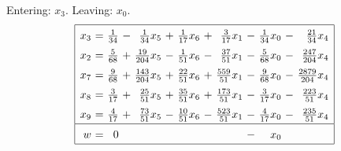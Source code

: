 \documentclass[11pt]{article}
\begin{document}
Entering: $x_{3}$. Leaving: $x_{0}$. 
\begin{equation*}
\renewcommand{\arraystretch}{1.5} %
\begin{array}{|rcrcrcrcrcrcr|}
\hline
x_{3} \mspace{-6mu}&\mspace{-6mu} = \mspace{-6mu}&\mspace{-6mu} \frac{1}{34} \mspace{-6mu}&\mspace{-6mu} - \mspace{-6mu}&\mspace{-6mu} \frac{1}{34} x_{5} \mspace{-6mu}&\mspace{-6mu} + \mspace{-6mu}&\mspace{-6mu} \frac{1}{17} x_{6} \mspace{-6mu}&\mspace{-6mu} + \mspace{-6mu}&\mspace{-6mu} \frac{3}{17} x_{1} \mspace{-6mu}&\mspace{-6mu} - \mspace{-6mu}&\mspace{-6mu} \frac{1}{34} x_{0} \mspace{-6mu}&\mspace{-6mu} - \mspace{-6mu}&\mspace{-6mu} \frac{21}{34} x_{4}\\
x_{2} \mspace{-6mu}&\mspace{-6mu} = \mspace{-6mu}&\mspace{-6mu} \frac{5}{68} \mspace{-6mu}&\mspace{-6mu} + \mspace{-6mu}&\mspace{-6mu} \frac{19}{204} x_{5} \mspace{-6mu}&\mspace{-6mu} - \mspace{-6mu}&\mspace{-6mu} \frac{1}{51} x_{6} \mspace{-6mu}&\mspace{-6mu} - \mspace{-6mu}&\mspace{-6mu} \frac{37}{51} x_{1} \mspace{-6mu}&\mspace{-6mu} - \mspace{-6mu}&\mspace{-6mu} \frac{5}{68} x_{0} \mspace{-6mu}&\mspace{-6mu} - \mspace{-6mu}&\mspace{-6mu} \frac{247}{204} x_{4}\\
x_{7} \mspace{-6mu}&\mspace{-6mu} = \mspace{-6mu}&\mspace{-6mu} \frac{9}{68} \mspace{-6mu}&\mspace{-6mu} + \mspace{-6mu}&\mspace{-6mu} \frac{143}{204} x_{5} \mspace{-6mu}&\mspace{-6mu} + \mspace{-6mu}&\mspace{-6mu} \frac{22}{51} x_{6} \mspace{-6mu}&\mspace{-6mu} + \mspace{-6mu}&\mspace{-6mu} \frac{559}{51} x_{1} \mspace{-6mu}&\mspace{-6mu} - \mspace{-6mu}&\mspace{-6mu} \frac{9}{68} x_{0} \mspace{-6mu}&\mspace{-6mu} - \mspace{-6mu}&\mspace{-6mu} \frac{2879}{204} x_{4}\\
x_{8} \mspace{-6mu}&\mspace{-6mu} = \mspace{-6mu}&\mspace{-6mu} \frac{3}{17} \mspace{-6mu}&\mspace{-6mu} + \mspace{-6mu}&\mspace{-6mu} \frac{25}{51} x_{5} \mspace{-6mu}&\mspace{-6mu} + \mspace{-6mu}&\mspace{-6mu} \frac{35}{51} x_{6} \mspace{-6mu}&\mspace{-6mu} + \mspace{-6mu}&\mspace{-6mu} \frac{173}{51} x_{1} \mspace{-6mu}&\mspace{-6mu} - \mspace{-6mu}&\mspace{-6mu} \frac{3}{17} x_{0} \mspace{-6mu}&\mspace{-6mu} - \mspace{-6mu}&\mspace{-6mu} \frac{223}{51} x_{4}\\
x_{9} \mspace{-6mu}&\mspace{-6mu} = \mspace{-6mu}&\mspace{-6mu} \frac{4}{17} \mspace{-6mu}&\mspace{-6mu} + \mspace{-6mu}&\mspace{-6mu} \frac{73}{51} x_{5} \mspace{-6mu}&\mspace{-6mu} - \mspace{-6mu}&\mspace{-6mu} \frac{10}{51} x_{6} \mspace{-6mu}&\mspace{-6mu} - \mspace{-6mu}&\mspace{-6mu} \frac{523}{51} x_{1} \mspace{-6mu}&\mspace{-6mu} - \mspace{-6mu}&\mspace{-6mu} \frac{4}{17} x_{0} \mspace{-6mu}&\mspace{-6mu} - \mspace{-6mu}&\mspace{-6mu} \frac{235}{51} x_{4}\\
\hline
w \mspace{-6mu}&\mspace{-6mu} = \mspace{-6mu}&\mspace{-6mu} 0 \mspace{-6mu}&\mspace{-6mu}  \mspace{-6mu}&\mspace{-6mu}  \mspace{-6mu}&\mspace{-6mu}  \mspace{-6mu}&\mspace{-6mu}  \mspace{-6mu}&\mspace{-6mu}  \mspace{-6mu}&\mspace{-6mu}  \mspace{-6mu}&\mspace{-6mu} - \mspace{-6mu}&\mspace{-6mu} x_{0} \mspace{-6mu}&\mspace{-6mu}  \mspace{-6mu}&\mspace{-6mu} \\
\hline
\end{array}
\end{equation*}
\end{document}
